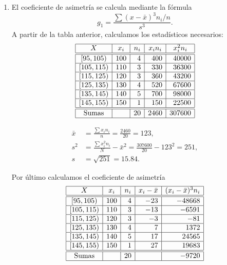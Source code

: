 {\begin{enumerate}
\item El coeficiente de asimetría se calcula mediante la fórmula 
\[g_1=\frac{\sum (x-\bar{x})^3n_i/n}{s^3}.\]
A partir de la tabla anterior, calculamos los estadísticos necesarios: 
\[
\begin{array}{|c|r|r|r|r|}
\hline
   X  & \multicolumn{1}{c|}{x_i} & \multicolumn{1}{c|}{n_i} & \multicolumn{1}{c|}{x_in_i} & \multicolumn{1}{c|}{x_i^2n_i}\\
\hline\hline
  [95,105)  &  100  &   4       & 400 & 40000\\
\hline
 [105,115)  &  110 &    3       & 330 & 36300 \\
\hline
 [115,125) &  120 &    3       & 360 &  43200\\
\hline
 [125,135) &  130 &    4       & 520 & 67600 \\
\hline
 [135,145) &  140 &    5       & 700 & 98000 \\
\hline
 [145,155) &  150 &     1       & 150 & 22500\\
\hline
\hline
\textrm{Sumas} & & 20 & 2460 & 307600\\
\hline
\end{array}
\]

\begin{align*}
\bar{x} & = \frac{\sum x_in_i}{n}=\frac{2460}{20}=123,\\
s^2 & =\frac{\sum x_i^2n_i}{N}-\bar{x}^2= \frac{307600}{20}-123^2=251,\\
s & =\sqrt{251}=15.84.
\end{align*}

Por último calculamos el coeficiente de asimetría
\[
\begin{array}{|c|r|r|r|r|}
\hline
   X  & \multicolumn{1}{c|}{x_i} & \multicolumn{1}{c|}{n_i} & \multicolumn{1}{c|}{x_i-\bar{x}} & \multicolumn{1}{c|}{(x_i-\bar{x})^3n_i}\\
\hline\hline
  [95,105)  &  100  &   4       & -23 & -48668\\
\hline
 [105,115)  &  110 &    3       & -13 & -6591 \\
\hline
 [115,125) &  120 &    3       & -3 &  -81\\
\hline
 [125,135) &  130 &    4       & 7 & 1372 \\
\hline
 [135,145) &  140 &    5       & 17 & 24565 \\
\hline
 [145,155) &  150 &     1       & 27 & 19683\\
\hline
\hline
\textrm{Sumas} & & 20 &  & -9720\\
\hline
\end{array}
\]


\end{enumerate}}
